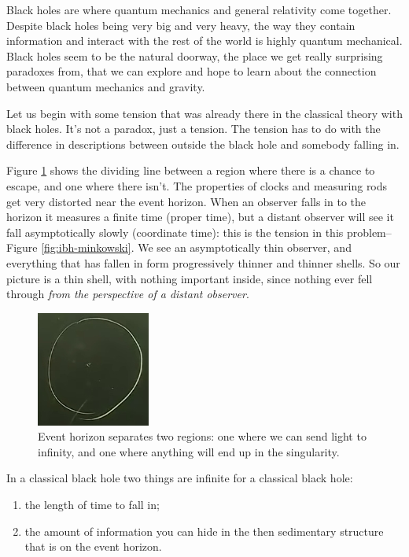 \documentclass[]{article}
\begin{document}
Black holes are where quantum mechanics and general relativity come together. Despite black holes being very big and very heavy, the way they contain information and interact with the rest of the world is highly quantum mechanical. Black holes seem to be the natural doorway, the place we get really surprising paradoxes from, that we can explore and hope to learn about the connection between quantum mechanics and gravity.

Let us begin with some tension that was already there in the classical theory with black holes. It's not a paradox, just a tension. The tension has to do with the difference in descriptions between outside the black hole and somebody falling in.

Figure \ref{fig:ibh-horizon} shows the dividing line between a region where there is a chance to escape, and one where there isn't. The properties of clocks and measuring rods get very distorted near the event horizon. When an observer falls in to the horizon it measures a finite time (proper time), but a distant observer will see it fall asymptotically slowly (coordinate time): this is the tension in this problem--Figure \ref{fig:ibh-minkowski}. We see an asymptotically thin observer, and everything that has fallen in form progressively thinner and thinner shells. So our picture is a thin shell, with nothing important inside, since nothing ever fell through \emph{from the perspective of a distant observer}.
\begin{figure}[H]
	\begin{center}
		\caption[Event horizon separates two regions]{Event horizon separates two regions: one where we can send light to infinity, and one where anything will end up in the singularity.}\label{fig:ibh-horizon}
		\includegraphics{ibh-horizon}
	\end{center}
\end{figure}

In a classical black hole two things are infinite for a classical black hole:
\begin{enumerate}
	\item the length of time to fall in;
	\item the amount of information you can hide in the then sedimentary structure that is on the event horizon.
\end{enumerate}
\end{document}
